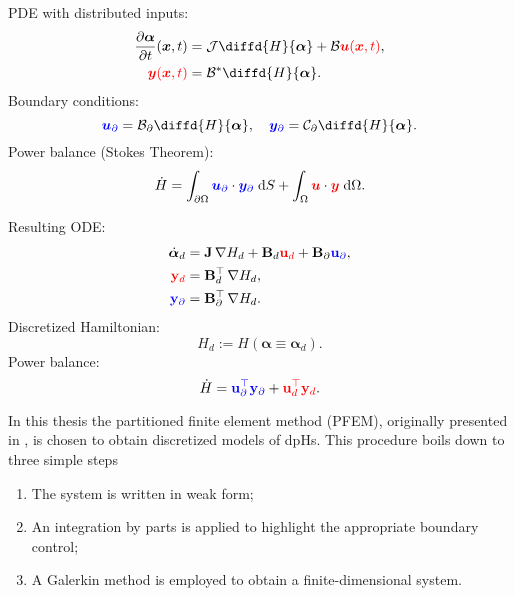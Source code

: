 \begin{tcbraster}[raster columns=2, raster equal height]
\begin{tcolorbox}[width=0.4\textwidth, nobeforeafter, colframe=theme,title=Infinite dimensional pH system]%
	PDE with distributed inputs:
	\begin{align*}
	\diffp{\bm{\alpha}}{t}(\bm{x}, t) &= \mathcal{J} {\displaystyle \diffd{H}{\bm{\alpha}}}+ \mathcal{B} \textcolor{red}{\bm{u}(\bm{x}, t)}, \\
	\textcolor{red}{\bm{y}(\bm{x}, t)} &= \mathcal{B}^* {\displaystyle \diffd{H}{\bm{\alpha}}}.
	\end{align*}
	Boundary conditions: 
	\[\textcolor{blue}{\bm{u}_\partial} = \mathcal{B}_\partial{\displaystyle \diffd{H}{\bm{\alpha}}}, \quad \textcolor{blue}{\bm{y}_\partial} = \mathcal{C}_\partial {\displaystyle \diffd{H}{\bm{\alpha}}}. \]
	Power balance (Stokes Theorem): 
	\[ \dot{H} = \displaystyle \int_{\partial \Omega} \textcolor{blue}{\bm{u}_\partial} \cdot \textcolor{blue}{\bm{y}_\partial} \d{S} +  \int_{\Omega} \textcolor{red}{\bm{u}} \cdot \textcolor{red}{\bm{y}} \d{\Omega}.
	\]
\end{tcolorbox} 
\begin{tcolorbox}[width=0.4\textwidth, nobeforeafter,  colframe=theme,title=Structure-preserving discretization]%
	Resulting ODE:
	\begin{align*}
	\dot{\bm{\alpha}}_d &= \mathbf{J} \, {\nabla {H}_d} + \mathbf{B}_d \textcolor{red}{\mathbf{u}_d} + \mathbf{B}_\partial \textcolor{blue}{\mathbf{u}_\partial}, \\
	\textcolor{red}{\mathbf{y}_d} &= \mathbf{B}_d^\top \, {\nabla {H}_d}, \\
	\textcolor{blue}{\mathbf{y}_\partial} &= \mathbf{B}_\partial^\top \,{\nabla {H}_d}.
	\end{align*}
	Discretized Hamiltonian:
	\[
	H_d := H(\bm{\alpha} \equiv \bm{\alpha}_d).
	\]
	Power balance: 
	\[ \dot{H} = \textcolor{blue}{\mathbf{u}_\partial^\top \mathbf{y}_\partial} +  \textcolor{red}{\mathbf{u}_d^\top \mathbf{y}_d}.
	\]
\end{tcolorbox}
\end{tcbraster}
\vspace{.5cm}
In this thesis the partitioned finite element method (PFEM), originally presented in \cite{cardoso2018pfem,cardoso2019partitioned}, is chosen to obtain discretized models of dpHs. This procedure boils down to three simple steps
\begin{enumerate}
	\item The system is written in weak form; 
	\item An integration by parts is applied to highlight the appropriate boundary control;
	\item A Galerkin method is employed to obtain a finite-dimensional system.
\end{enumerate}

